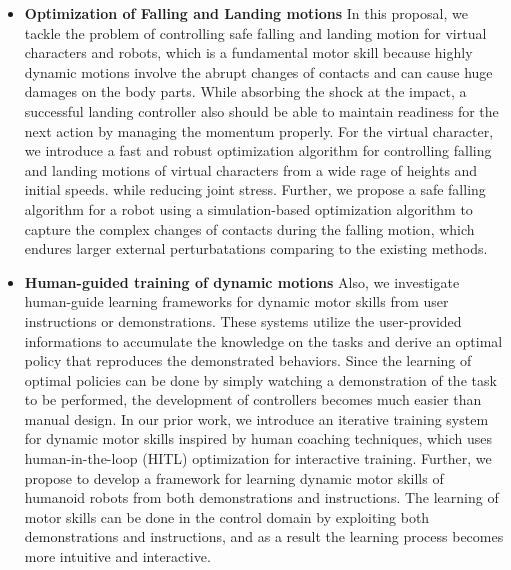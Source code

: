 \begin{itemize}
\item 
  \textbf{Optimization of Falling and Landing motions}
  In this proposal, we tackle the problem of controlling safe falling 
  and landing motion for virtual characters and robots, which is a fundamental
  motor skill because highly dynamic motions involve the abrupt changes
  of contacts and can cause huge damages on the body parts.
  While absorbing the shock at the impact, a successful landing controller 
  also should be able to maintain readiness for the next action by managing
  the momentum properly.
  For the virtual character, we introduce a fast and robust optimization 
  algorithm for controlling falling and landing motions of virtual
  characters from a wide rage of heights and initial speeds.
  while reducing joint stress.
  Further, we propose a safe falling algorithm for a robot using
  a simulation-based optimization algorithm to capture the complex
  changes of contacts during the falling motion, which endures larger 
  external perturbatations comparing to the existing methods.
\item 
  \textbf{Human-guided training of dynamic motions}
  Also, we investigate human-guide learning frameworks for dynamic
  motor skills from user instructions or demonstrations.
  These systems utilize the user-provided informations to
  accumulate the knowledge on the tasks and derive
  an optimal policy that reproduces the demonstrated behaviors.
  Since the learning of optimal policies can be done by simply
  watching a demonstration of the task to be performed,
  the development of controllers becomes much easier 
  than manual design.
  In our prior work, we introduce an iterative training system for dynamic
  motor skills inspired by human coaching techniques, which uses 
  human-in-the-loop (HITL) optimization for interactive training.  
  Further, we propose to develop a framework for learning 
  dynamic motor skills of humanoid robots
  from both demonstrations and instructions.
  The learning of motor skills can be done in the control domain
  by exploiting both demonstrations and instructions, and as a result 
  the learning process becomes  more intuitive and interactive.

\end{itemize}

